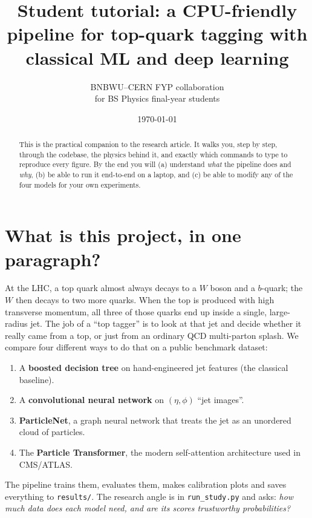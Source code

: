 \documentclass[11pt,a4paper]{article}
\title{\textbf{Student tutorial: a CPU-friendly pipeline for top-quark
tagging with classical ML and deep learning}}
\author{BNBWU--CERN FYP collaboration\\
        \small for BS Physics final-year students}
\date{\today}
\begin{document}
\maketitle
\begin{abstract}
This is the practical companion to the research article. It walks
you, step by step, through the codebase, the physics behind it, and
exactly which commands to type to reproduce every figure. By the end
you will (a) understand \emph{what} the pipeline does and \emph{why},
(b) be able to run it end-to-end on a laptop, and (c) be able to
modify any of the four models for your own experiments.
\end{abstract}

\tableofcontents
\vspace{0.4cm}

\section{What is this project, in one paragraph?}\label{sec:what}

At the LHC, a top quark almost always decays to a $W$ boson and a
$b$-quark; the $W$ then decays to two more quarks. When the top is
produced with high transverse momentum, all three of those quarks end
up inside a single, large-radius jet. The job of a ``top tagger'' is
to look at that jet and decide whether it really came from a top, or
just from an ordinary QCD multi-parton splash. We compare four
different ways to do that on a public benchmark dataset:
\begin{enumerate}
    \item A \textbf{boosted decision tree} on hand-engineered jet
          features (the classical baseline).
    \item A \textbf{convolutional neural network} on
          $(\eta,\phi)$ ``jet images''.
    \item \textbf{ParticleNet}, a graph neural network that treats
          the jet as an unordered cloud of particles.
    \item The \textbf{Particle Transformer}, the modern
          self-attention architecture used in CMS/ATLAS.
\end{enumerate}

The pipeline trains them, evaluates them, makes calibration plots and
saves everything to \texttt{results/}. The research angle is in
\texttt{run\_study.py} and asks: \emph{how much data does each model
need, and are its scores trustworthy probabilities?}
\end{document}
